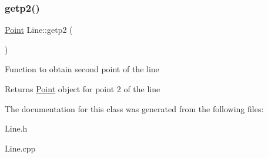 \subsubsection{\texorpdfstring{getp2()}{getp2()}}
{\footnotesize\ttfamily \hyperlink{classPoint}{Point} Line\+::getp2 (\begin{DoxyParamCaption}{ }\end{DoxyParamCaption})}

Function to obtain second point of the line

\begin{DoxyReturn}{Returns}
\hyperlink{classPoint}{Point} object for point 2 of the line 
\end{DoxyReturn}


The documentation for this class was generated from the following files\+:\begin{DoxyCompactItemize}
\item 
Line.\+h\item 
Line.\+cpp\end{DoxyCompactItemize}
